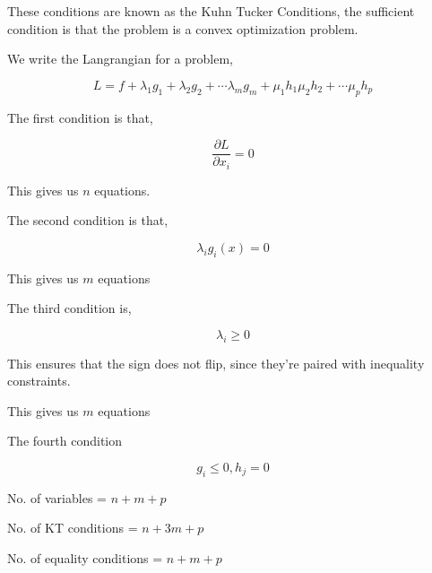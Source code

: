 \documentclass[11pt]{report}
\begin{document}
These conditions are known as the Kuhn Tucker Conditions, the sufficient condition is that the problem is a convex optimization problem.

We write the Langrangian for a problem,

$$L = f + \lambda_{1} g_{1} + \lambda_2g_2 + \cdots \lambda_m g_m + \mu_1 h_1 \mu_2h_2 + \cdots \mu_p h_{p}$$


The first condition is that,

$$\frac{\partial L}{\partial x_i} = 0$$

This gives us \(n\) equations.

The second condition is that,

$$\lambda_i g_i(x) = 0$$

This gives us \(m\) equations

The third condition is,

$$\lambda_i \ge 0$$

This ensures that the sign does not flip, since they're paired with inequality constraints.

This gives us \(m\) equations

The fourth condition

$$g_i \le 0, h_j = 0$$

No. of variables = \(n+m+p\)

No. of KT conditions = \(n + 3m + p\)

No. of equality conditions = \(n + m + p\)
\end{document}
